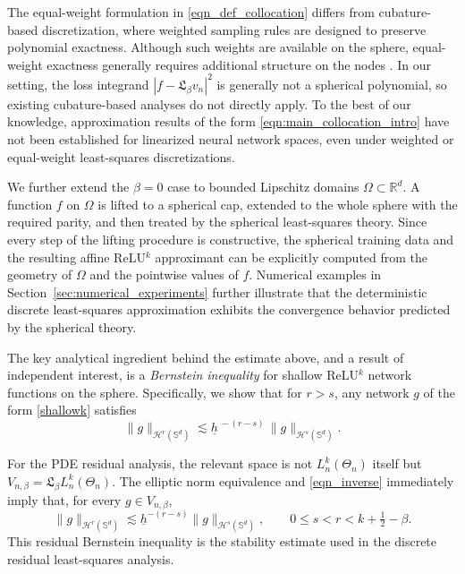 \documentclass{article}
\numberwithin{equation}{section}
\begin{document}
The equal-weight formulation in \eqref{eqn_def_collocation} differs from cubature-based discretization, where weighted sampling rules are designed to preserve polynomial exactness. Although such weights are available on the sphere, equal-weight exactness generally requires additional structure on the nodes \cite{mhaskar2001spherical,filbirMhaskar2011mz,leGiaMhaskar2009localized,bondarenko2013optimal}. In our setting, the loss integrand $|f-\mathfrak L_\beta v_n|^2$ is generally not a spherical polynomial, so existing cubature-based analyses do not directly apply. To the best of our knowledge, approximation results of the form \eqref{eqn:main_collocation_intro} have not been established for linearized neural network spaces, even under weighted or equal-weight least-squares discretizations.


We further extend the $\beta=0$ case to bounded Lipschitz domains $\Omega\subset\mathbb R^d$. A function $f$ on $\Omega$ is lifted to a spherical cap, extended to the whole sphere with the required parity, and then treated by the spherical least-squares theory. Since every step of the lifting procedure is constructive, the spherical training data and the resulting affine ReLU$^k$ approximant can be explicitly computed from the geometry of $\Omega$ and the pointwise values of $f$. Numerical examples in Section~\ref{sec:numerical_experiments} further illustrate that the deterministic discrete least-squares approximation exhibits the convergence behavior predicted by the spherical theory.


The key analytical ingredient behind the estimate above, and a result of independent interest, is a \emph{Bernstein inequality} for shallow ReLU\(^{k}\) network functions on the sphere. 
Specifically, we show that for $r>s$, any network $g$ of the form \eqref{shallowk} satisfies
\begin{equation}\label{eqn_inverse}
    \|g\|_{\mathcal{H}^r(\mathbb{S}^d)}
    \lesssim \underline{h}^{\,-(r-s)}\,
    \|g\|_{\mathcal{H}^s(\mathbb{S}^d)}.
\end{equation}

For the PDE residual analysis, the relevant space is not $L_n^k(\Theta_n)$ itself but $V_{n,\beta}=\mathfrak L_\beta L_n^k(\Theta_n)$. The elliptic norm equivalence and \eqref{eqn_inverse} immediately imply that, for every $g\in V_{n,\beta}$,
\begin{equation}\label{eqn:residual_bernstein_intro}
\|g\|_{\mathcal H^r(\mathbb S^d)}\lesssim\underline h^{-(r-s)}\|g\|_{\mathcal H^s(\mathbb S^d)},\qquad0\leq s<r<k+\tfrac12-\beta.
\end{equation}
This residual Bernstein inequality is the stability estimate used in the discrete residual least-squares analysis.
\end{document}
